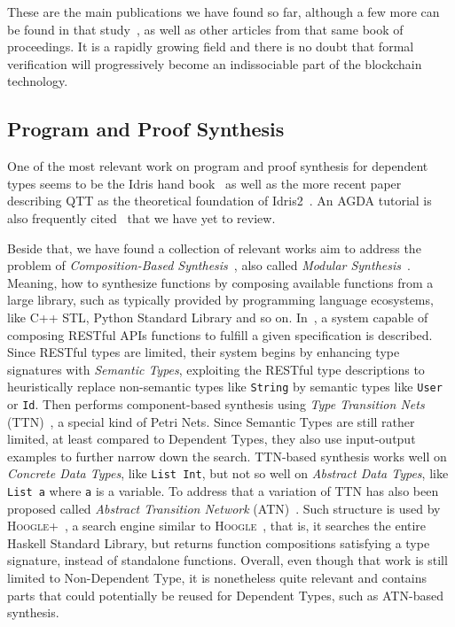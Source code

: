 \documentclass[]{report}
\begin{document}
These are the main publications we have found so far, although a few
more can be found in that study~\cite{Pace2020}, as well as other
articles from that same book of proceedings.  It is a rapidly growing
field and there is no doubt that formal verification will
progressively become an indissociable part of the blockchain
technology.

\subsection{Program and Proof Synthesis}

One of the most relevant work on program and proof synthesis for
dependent types seems to be the Idris hand book~\cite{Brady2017} as
well as the more recent paper describing QTT as the theoretical
foundation of Idris2~\cite{Brady2021}.  An AGDA tutorial is also
frequently cited~\cite{Norell2009} that we have yet to review.

Beside that, we have found a collection of relevant works aim to
address the problem of \emph{Composition-Based Synthesis}~\cite{TODO},
also called \emph{Modular Synthesis}~\cite{TODO}.  Meaning, how to
synthesize functions by composing available functions from a large
library, such as typically provided by programming language
ecosystems, like C++ STL, Python Standard Library and so on.
In~\cite{Guo2022}, a system capable of composing RESTful APIs
functions to fulfill a given specification is described.  Since
RESTful types are limited, their system begins by enhancing type
signatures with \emph{Semantic Types}, exploiting the RESTful type
descriptions to heuristically replace non-semantic types like
\texttt{String} by semantic types like \texttt{User} or \texttt{Id}.
Then performs component-based synthesis using \emph{Type Transition
  Nets} (TTN)~\cite{Feng2017}, a special kind of Petri Nets.  Since
Semantic Types are still rather limited, at least compared to
Dependent Types, they also use input-output examples to further narrow
down the search.  TTN-based synthesis works well on \emph{Concrete
  Data Types}, like \texttt{List Int}, but not so well on
\emph{Abstract Data Types}, like \texttt{List a} where \texttt{a} is a
variable.  To address that a variation of TTN has also been proposed
called \emph{Abstract Transition Network} (ATN)~\cite{Guo2020}.  Such
structure is used by \textsc{Hoogle+}~\cite{Michael2020}, a search
engine similar to \textsc{Hoogle}~\cite{Mitchell2004}, that is, it
searches the entire Haskell Standard Library, but returns function
compositions satisfying a type signature, instead of standalone
functions.  Overall, even though that work is still limited to
Non-Dependent Type, it is nonetheless quite relevant and contains
parts that could potentially be reused for Dependent Types, such as
ATN-based synthesis.
\end{document}
